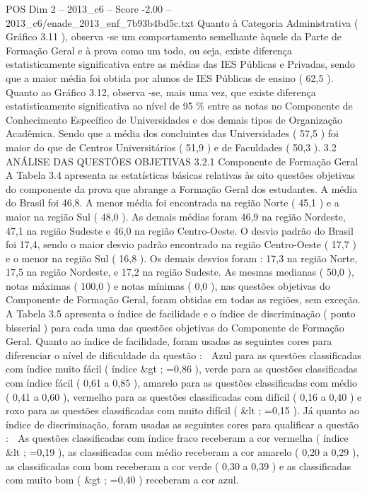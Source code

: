 \begin{textsample}{POS Dim 2 – 2013\_c6 – Score -2.00 – 2013\_c6/enade\_2013\_enf\_7b93b4bd5c.txt}
Quanto à Categoria Administrativa ( Gráfico 3.11 ), observa -se um comportamento semelhante àquele da Parte de Formação Geral e à prova como um todo, ou seja, existe diferença estatisticamente significativa entre as médias das IES Públicas e Privadas, sendo que a maior média foi obtida por alunos de IES Públicas de ensino ( 62,5 ).
Quanto ao Gráfico 3.12, observa -se, mais uma vez, que existe diferença estatisticamente significativa ao nível de 95 \% entre as notas no Componente de Conhecimento Específico de Universidades e dos demais tipos de Organização Acadêmica.
Sendo que a média dos concluintes das Universidades ( 57,5 ) foi maior do que de Centros Universitários ( 51,9 ) e de Faculdades ( 50,3 ). 3.2 ANÁLISE DAS QUESTÕES OBJETIVAS 3.2.1 Componente de Formação Geral A Tabela 3.4 apresenta as estatísticas básicas relativas às oito questões objetivas do componente da prova que abrange a Formação Geral dos estudantes.
A média do Brasil foi 46,8.
A menor média foi encontrada na região Norte ( 45,1 ) e a maior na região Sul ( 48,0 ).
As demais médias foram 46,9 na região Nordeste, 47,1 na região Sudeste e 46,0 na região Centro-Oeste.
O desvio padrão do Brasil foi 17,4, sendo o maior desvio padrão encontrado na região Centro-Oeste ( 17,7 ) e o menor na região Sul ( 16,8 ).
Os demais desvios foram : 17,3 na região Norte, 17,5 na região Nordeste, e 17,2 na região Sudeste.
As mesmas medianas ( 50,0 ), notas máximas ( 100,0 ) e notas mínimas ( 0,0 ), nas questões objetivas do Componente de Formação Geral, foram obtidas em todas as regiões, sem exceção.
A Tabela 3.5 apresenta o índice de facilidade e o índice de discriminação ( ponto bisserial ) para cada uma das questões objetivas do Componente de Formação Geral.
Quanto ao índice de facilidade, foram usadas as seguintes cores para diferenciar o nível de dificuldade da questão :  Azul para as questões classificadas com índice muito fácil ( índice \&gt ; =0,86 ), verde para as questões classificadas com índice fácil ( 0,61 a 0,85 ), amarelo para as questões classificadas com médio ( 0,41 a 0,60 ), vermelho para as questões classificadas com difícil ( 0,16 a 0,40 ) e roxo para as questões classificadas com muito difícil ( \&lt ; =0,15 ).
Já quanto ao índice de discriminação, foram usadas as seguintes cores para qualificar a questão :  As questões classificadas com índice fraco receberam a cor vermelha ( índice \&lt ; =0,19 ), as classificadas com médio receberam a cor amarelo ( 0,20 a 0,29 ), as classificadas com bom receberam a cor verde ( 0,30 a 0,39 ) e as classificadas com muito bom ( \&gt ; =0,40 ) receberam a cor azul.

\end{textsample}
